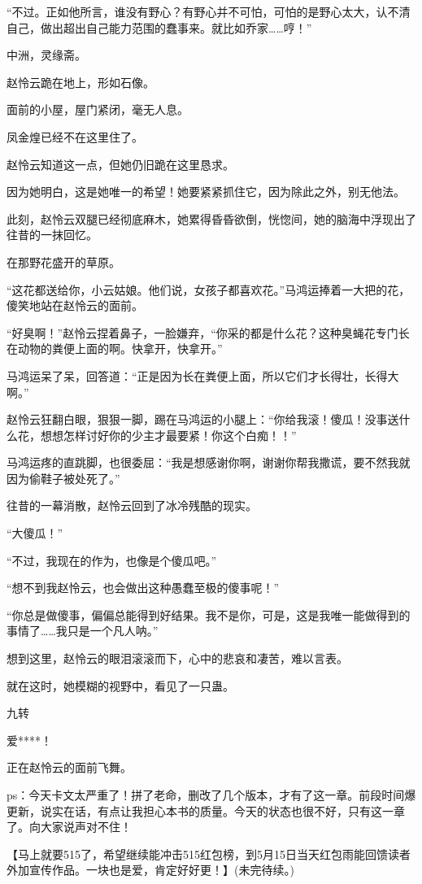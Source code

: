\begin{this_body}
“不过。正如他所言，谁没有野心？有野心并不可怕，可怕的是野心太大，认不清自己，做出超出自己能力范围的蠢事来。就比如乔家……哼！”

中洲，灵缘斋。

赵怜云跪在地上，形如石像。

面前的小屋，屋门紧闭，毫无人息。

凤金煌已经不在这里住了。

赵怜云知道这一点，但她仍旧跪在这里恳求。

因为她明白，这是她唯一的希望！她要紧紧抓住它，因为除此之外，别无他法。

此刻，赵怜云双腿已经彻底麻木，她累得昏昏欲倒，恍惚间，她的脑海中浮现出了往昔的一抹回忆。

在那野花盛开的草原。

“这花都送给你，小云姑娘。他们说，女孩子都喜欢花。”马鸿运捧着一大把的花，傻笑地站在赵怜云的面前。

“好臭啊！”赵怜云捏着鼻子，一脸嫌弃，“你采的都是什么花？这种臭蝇花专门长在动物的粪便上面的啊。快拿开，快拿开。”

马鸿运呆了呆，回答道：“正是因为长在粪便上面，所以它们才长得壮，长得大啊。”

赵怜云狂翻白眼，狠狠一脚，踢在马鸿运的小腿上：“你给我滚！傻瓜！没事送什么花，想想怎样讨好你的少主才最要紧！你这个白痴！！”

马鸿运疼的直跳脚，也很委屈：“我是想感谢你啊，谢谢你帮我撒谎，要不然我就因为偷鞋子被处死了。”

往昔的一幕消散，赵怜云回到了冰冷残酷的现实。

“大傻瓜！”

“不过，我现在的作为，也像是个傻瓜吧。”

“想不到我赵怜云，也会做出这种愚蠢至极的傻事呢！”

“你总是做傻事，偏偏总能得到好结果。我不是你，可是，这是我唯一能做得到的事情了……我只是一个凡人呐。”

想到这里，赵怜云的眼泪滚滚而下，心中的悲哀和凄苦，难以言表。

就在这时，她模糊的视野中，看见了一只蛊。

九转

爱****！

正在赵怜云的面前飞舞。

ps：今天卡文太严重了！拼了老命，删改了几个版本，才有了这一章。前段时间爆更新，说实在话，有点让我担心本书的质量。今天的状态也很不好，只有这一章了。向大家说声对不住！

【马上就要515了，希望继续能冲击515红包榜，到5月15日当天红包雨能回馈读者外加宣传作品。一块也是爱，肯定好好更！】(未完待续。)

\end{this_body}

